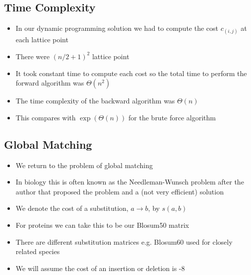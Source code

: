 \begin{slide}
\section{Time Complexity}

\begin{PauseHighLight}
  \begin{itemize}
  \item In our dynamic programming solution we had to compute the cost
    $c_{(i,j)}$ at each lattice point\pause
  \item There were $(n/2+1)^2$ lattice point\pause
  \item It took constant time to compute each cost so the total time to
    perform the forward algorithm was $\Theta(n^2)$\pause
  \item The time complexity of the backward algorithm was
    $\Theta(n)$\pause
  \item This compares with $\exp(\Theta(n))$ for the brute force
    algorithm\pause 
  \end{itemize}
\end{PauseHighLight}

\end{slide}

\Outline %

\begin{slide}
\section[-2]{Global Matching}

\begin{PauseHighLight}
  \begin{itemize}
  \item We return to the problem of global matching\pause
  \item In biology this is often known as the Needleman-Wunsch problem
    after the author that proposed the problem and a (not very
    efficient) solution\pause
  \item We denote the cost of a substitution, $a\rightarrow b$, by
    $s(a,b)$\pause
  \item For proteins we can take this to be our Blosum50 matrix\pause
  \item There are different substitution matrices e.g. Blosum60 used for
    closely related species\pause
  \item We will assume the cost of an insertion or deletion is -8\pause
  \end{itemize}
\end{PauseHighLight}

\end{slide}

